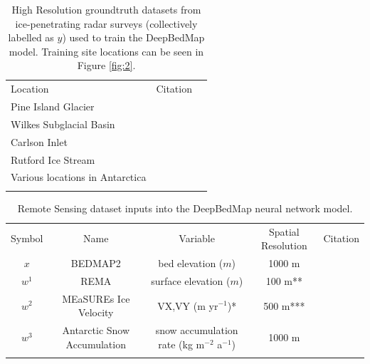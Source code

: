 \documentclass[tc, manuscript]{copernicus}
\begin{document}
\begin{table}[htbp]
  \caption{
    High Resolution groundtruth datasets from ice-penetrating radar surveys (collectively labelled as $y$) used to train the DeepBedMap model.
    Training site locations can be seen in Figure \ref{fig:2}.
  }
  \label{table:groundtruthdata}
  \begin{tabular}{lcr}
  \tophline
  Location & Citation \\
  \middlehline
  Pine Island Glacier & \cite{BinghamDiverselandscapesPine2017} \\
  Wilkes Subglacial Basin & \cite{JordanHypothesismegaoutburstflooding2010} \\
  Carlson Inlet & \cite{KingIcestreamnot2011} \\
  Rutford Ice Stream & \cite{KingSubglaciallandformsRutford2016} \\
  Various locations in Antarctica & \cite{ShiMultichannelCoherentRadar2010} \\
  \bottomhline
  \end{tabular}
  \belowtable{} %
\end{table}

\begin{table}[htbp]
  \caption{Remote Sensing dataset inputs into the DeepBedMap neural network model.}
  \label{table:datainputs}
  \begin{tabular}{ccccc}
  \tophline
  Symbol & Name & Variable & Spatial Resolution & Citation \\
  \middlehline
  $x$ & BEDMAP2 & bed elevation ($m$) & 1000 m & \cite{FretwellBedmap2improvedice2013} \\
  $w^1$ & REMA & surface elevation ($m$) & 100 m** & \cite{HowatReferenceElevationModel2018} \\
  $w^2$ & MEaSUREs Ice Velocity & VX,VY (m yr$^{-1}$)* & 500 m*** & \cite{MouginotContinentwideinterferometric2019} \\
  $w^3$ & Antarctic Snow Accumulation & snow accumulation rate (kg m$^{-2}$ a$^{-1}$) & 1000 m & \cite{ArthernAntarcticsnowaccumulation2006} \\
  \bottomhline
  \end{tabular}
\end{table}
\end{document}

